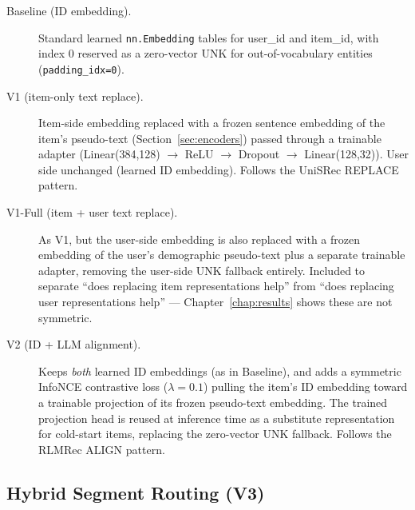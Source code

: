 \documentclass{uclthesis}
\begin{document}
\begin{description}
  \item[Baseline (ID embedding).] Standard learned \texttt{nn.Embedding} tables for user\_id and item\_id, with index 0 reserved as a zero-vector UNK for out-of-vocabulary entities (\texttt{padding\_idx=0}).
  \item[V1 (item-only text replace).] Item-side embedding replaced with a frozen sentence embedding of the item's pseudo-text (Section~\ref{sec:encoders}) passed through a trainable adapter (Linear(384,128) $\to$ ReLU $\to$ Dropout $\to$ Linear(128,32)). User side unchanged (learned ID embedding). Follows the UniSRec \citep{hou2022unisrec} REPLACE pattern.
  \item[V1-Full (item + user text replace).] As V1, but the user-side embedding is also replaced with a frozen embedding of the user's demographic pseudo-text plus a separate trainable adapter, removing the user-side UNK fallback entirely. Included to separate ``does replacing item representations help'' from ``does replacing user representations help'' --- Chapter~\ref{chap:results} shows these are not symmetric.
  \item[V2 (ID + LLM alignment).] Keeps \emph{both} learned ID embeddings (as in Baseline), and adds a symmetric InfoNCE contrastive loss ($\lambda = 0.1$) pulling the item's ID embedding toward a trainable projection of its frozen pseudo-text embedding. The trained projection head is reused at inference time as a substitute representation for cold-start items, replacing the zero-vector UNK fallback. Follows the RLMRec \citep{ren2024rlmrec} ALIGN pattern.
\end{description}

\subsection{Hybrid Segment Routing (V3)}
\label{sec:v3}
\end{document}
